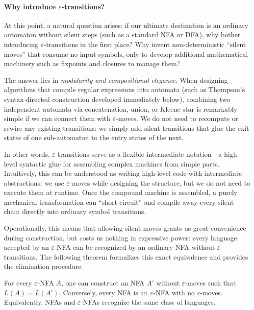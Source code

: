 \paragraph{Why introduce $\varepsilon$-transitions?}
At this point, a natural question arises: if our ultimate destination is an ordinary automaton without silent steps (such as a standard NFA or DFA), why bother introducing $\varepsilon$-transitions in the first place? Why invent non-deterministic ``silent moves'' that consume no input symbols, only to develop additional mathematical machinery such as fixpoints and closures to manage them?

The answer lies in \emph{modularity and compositional elegance}. When designing algorithms that compile regular expressions into automata (such as Thompson's syntax-directed construction developed immediately below), combining two independent automata via concatenation, union, or Kleene star is remarkably simple if we can connect them with $\varepsilon$-moves. We do not need to recompute or rewire any existing transitions: we simply add silent transitions that glue the exit states of one sub-automaton to the entry states of the next.

In other words, $\varepsilon$-transitions serve as a flexible intermediate notation---a high-level syntactic glue for assembling complex machines from simple parts. Intuitively, this can be understood as writing high-level code with intermediate abstractions: we use $\varepsilon$-moves while designing the structure, but we do not need to execute them at runtime. Once the compound machine is assembled, a purely mechanical transformation can ``short-circuit'' and compile away every silent chain directly into ordinary symbol transitions. 

Operationally, this means that allowing silent moves grants us great convenience during construction, but costs us nothing in expressive power: every language accepted by an $\varepsilon$-NFA can be recognized by an ordinary NFA without $\varepsilon$-transitions. The following theorem formalizes this exact equivalence and provides the elimination procedure.

\begin{theorem}
\label{thm:epsilon-removal}
For every $\varepsilon$-NFA $A$, one can construct an NFA $A'$ without
$\varepsilon$-moves such that $L(A)=L(A')$.  Conversely, every NFA is
an $\varepsilon$-NFA with no $\varepsilon$-moves.  Equivalently, NFAs
and $\varepsilon$-NFAs recognize the same class of languages.
\end{theorem}

